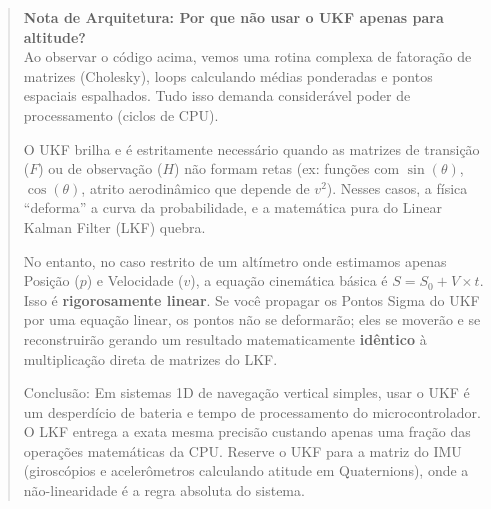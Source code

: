 \documentclass[12pt,a4paper]{article}
\begin{document}
\begin{quote}
\textbf{Nota de Arquitetura: Por que não usar o UKF apenas para altitude?} \\
Ao observar o código acima, vemos uma rotina complexa de fatoração de matrizes (Cholesky), loops calculando médias ponderadas e pontos espaciais espalhados. Tudo isso demanda considerável poder de processamento (ciclos de CPU). 

O UKF brilha e é estritamente necessário quando as matrizes de transição ($F$) ou de observação ($H$) não formam retas (ex: funções com $\sin(\theta)$, $\cos(\theta)$, atrito aerodinâmico que depende de $v^2$). Nesses casos, a física ``deforma'' a curva da probabilidade, e a matemática pura do Linear Kalman Filter (LKF) quebra.

No entanto, no caso restrito de um altímetro onde estimamos apenas Posição ($p$) e Velocidade ($v$), a equação cinemática básica é $S = S_0 + V \times t$. Isso é \textbf{rigorosamente linear}. Se você propagar os Pontos Sigma do UKF por uma equação linear, os pontos não se deformarão; eles se moverão e se reconstruirão gerando um resultado matematicamente \textbf{idêntico} à multiplicação direta de matrizes do LKF. 

Conclusão: Em sistemas 1D de navegação vertical simples, usar o UKF é um desperdício de bateria e tempo de processamento do microcontrolador. O LKF entrega a exata mesma precisão custando apenas uma fração das operações matemáticas da CPU. Reserve o UKF para a matriz do IMU (giroscópios e acelerômetros calculando atitude em Quaternions), onde a não-linearidade é a regra absoluta do sistema.
\end{quote}
\end{document}
